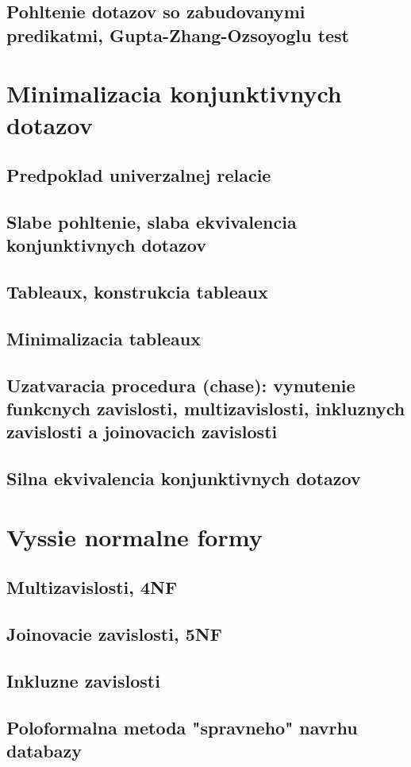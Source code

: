 \documentclass[12pt,a4paper]{article}
\begin{document}
\subsection{Pohltenie dotazov so zabudovanymi predikatmi, Gupta-Zhang-Ozsoyoglu test}

\section{Minimalizacia konjunktivnych dotazov}

\subsection{Predpoklad univerzalnej relacie}

\subsection{Slabe pohltenie, slaba ekvivalencia konjunktivnych dotazov}

\subsection{Tableaux, konstrukcia tableaux}

\subsection{Minimalizacia tableaux}

\subsection{Uzatvaracia procedura (chase): vynutenie funkcnych zavislosti, multizavislosti, inkluznych zavislosti a joinovacich zavislosti}

\subsection{Silna ekvivalencia konjunktivnych dotazov}

\section{Vyssie normalne formy}

\subsection{Multizavislosti, 4NF}

\subsection{Joinovacie zavislosti, 5NF}

\subsection{Inkluzne zavislosti}

\subsection{Poloformalna metoda "spravneho" navrhu databazy}


 
\end{document}
